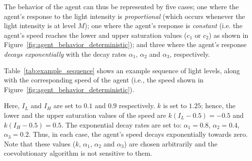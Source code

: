 
The behavior of the agent can thus be represented by five cases; one where the agent's response to the light intensity is \textit{proportional} (which occurs whenever the light intensity is at level $M$); one where the agent's response is \textit{constant} (i.e. the agent's speed reaches the lower and upper saturation values ($c_1$ or $c_2$) as shown in Figure~\ref{fig:agent_behavior_deterministic}); and three where the agent's response \textit{decays exponentially} with the decay rates $\alpha_1$, $\alpha_2$ and $\alpha_3$, respectively.

Table~\ref{tab:example_sequence} shows an example sequence of light levels, along with the corresponding speed of the agent (i.e., the speed shown in Figure~\ref{fig:agent_behavior_deterministic}). 

Here, $I_L$ and $I_H$ are set to $0.1$ and $0.9$ respectively.  $k$ is set to $1.25$; hence, the lower and the upper saturation values of the speed are $k\left(I_L - 0.5\right) = -0.5$ and $k\left(I_H - 0.5\right) = 0.5$. The exponential decay rates are set to: $\alpha_1=0.8$, $\alpha_2=0.4$, $\alpha_3=0.2$. Thus, in each case, the agent's speed decays exponentially towards zero. Note that these values ($k$, $\alpha_1$, $\alpha_2$ and $\alpha_3$) are chosen arbitrarily and the coevolutionary algorithm is not sensitive to them. 

